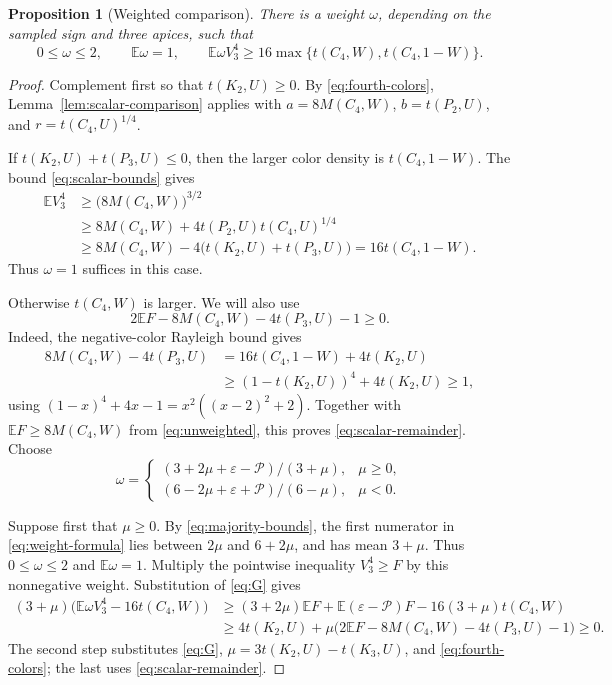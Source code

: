 \documentclass[11pt,a4paper]{article}
\newtheorem{proposition}[theorem]{Proposition}
\theoremstyle{remark}
\numberwithin{equation}{section}
\newcommand{\E}{\mathbb E}
\newcommand{\maj}{\mathcal P}
\begin{document}
\begin{proposition}[Weighted comparison]\label{prop:weighted}
There is a weight $\omega$, depending on the sampled sign and
three apices, such that
\begin{equation}\label{eq:weighted}
 0\leq\omega\leq2,\qquad \E\omega=1,
 \qquad \E\omega V_3^4
       \geq16\max\{t(C_4,W),t(C_4,1-W)\}.
\end{equation}
\end{proposition}
\begin{proof}
Complement first so that $t(K_2,U)\geq0$. By
\eqref{eq:fourth-colors}, Lemma~\ref{lem:scalar-comparison}
applies with $a=8M(C_4,W)$, $b=t(P_2,U)$, and
$r=t(C_4,U)^{1/4}$.

If $t(K_2,U)+t(P_3,U)\leq0$, then the larger color density is
$t(C_4,1-W)$. The bound \eqref{eq:scalar-bounds} gives
\begin{align*}
 \E V_3^4
 &\geq\bigl(8M(C_4,W)\bigr)^{3/2}\\
 &\geq8M(C_4,W)+4t(P_2,U)t(C_4,U)^{1/4}\\
 &\geq8M(C_4,W)-4\bigl(t(K_2,U)+t(P_3,U)\bigr)
   =16t(C_4,1-W).
\end{align*}
Thus $\omega=1$ suffices in this case.

Otherwise $t(C_4,W)$ is larger. We will also use
\begin{equation}\label{eq:scalar-remainder}
 2\E F-8M(C_4,W)-4t(P_3,U)-1\geq0.
\end{equation}
Indeed, the negative-color Rayleigh bound gives
\begin{align*}
 8M(C_4,W)-4t(P_3,U)
 &=16t(C_4,1-W)+4t(K_2,U)\\
 &\geq(1-t(K_2,U))^4+4t(K_2,U)\geq1,
\end{align*}
using $(1-x)^4+4x-1=x^2((x-2)^2+2)$.
Together with $\E F\geq8M(C_4,W)$ from
\eqref{eq:unweighted}, this proves \eqref{eq:scalar-remainder}.
Choose
\begin{equation}\label{eq:weight-formula}
 \omega=
 \begin{cases}
 (3+2\mu+\varepsilon-\maj)/(3+\mu),&\mu\geq0,\\[2pt]
 (6-2\mu+\varepsilon+\maj)/(6-\mu),&\mu<0.
 \end{cases}
\end{equation}

Suppose first that $\mu\geq0$. By \eqref{eq:majority-bounds},
the first numerator in \eqref{eq:weight-formula}
lies between $2\mu$ and $6+2\mu$, and has mean $3+\mu$.
Thus $0\leq\omega\leq2$ and $\E\omega=1$.
Multiply the pointwise inequality $V_3^4\geq F$ by this
nonnegative weight. Substitution of \eqref{eq:G} gives
\begin{align*}
 (3+\mu)\bigl(\E\omega V_3^4-16t(C_4,W)\bigr)
 &\geq(3+2\mu)\E F+\E(\varepsilon-\maj)F
                                  -16(3+\mu)t(C_4,W)\\
 &\geq4t(K_2,U)
     +\mu\bigl(2\E F-8M(C_4,W)-4t(P_3,U)-1\bigr)\geq0.
\end{align*}
The second step substitutes \eqref{eq:G},
$\mu=3t(K_2,U)-t(K_3,U)$, and \eqref{eq:fourth-colors};
the last uses \eqref{eq:scalar-remainder}.


\end{proof}
\end{document}
